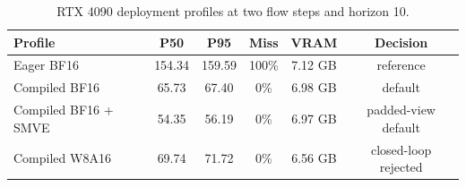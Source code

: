 \begin{table}
\caption{RTX 4090 deployment profiles at two flow steps and horizon 10.}
\label{tab:deployment}
\centering\small
\begin{tabular}{lccccc}
\toprule
Profile & P50 & P95 & Miss & VRAM & Decision \\
\midrule
Eager BF16 & 154.34 & 159.59 & 100\% & 7.12 GB & reference \\
Compiled BF16 & 65.73 & 67.40 & 0\% & 6.98 GB & default \\
Compiled BF16 + SMVE & 54.35 & 56.19 & 0\% & 6.97 GB & padded-view default \\
Compiled W8A16 & 69.74 & 71.72 & 0\% & 6.56 GB & closed-loop rejected \\
\bottomrule
\end{tabular}
\end{table}
